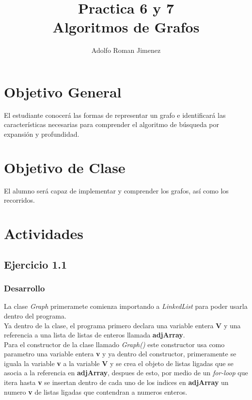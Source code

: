 \documentclass{article}
\title
{
	Practica 6 y 7\\
	Algoritmos de Grafos
}
\author
{
	Adolfo Roman Jimenez
}
\begin{document}
	
	
	
	\maketitle
	
	\section{Objetivo General}
	
	El estudiante conocerá las formas de representar un grafo e identificará las
	características necesarias para comprender el algoritmo de búsqueda por expansión y	profundidad.
	
	\section{Objetivo de Clase}
	
	El alumno será capaz de implementar y comprender los grafos, así como los
	recorridos. 
	
	\newpage
	
	\section{Actividades}
	
		\subsection{Ejercicio 1.1}
		
			\subsubsection{Desarrollo}
			
			
				La clase \emph{Graph} primeramete comienza importando a \emph{LinkedList} para poder usarla dentro del programa.\\
				
				Ya dentro de la clase, el programa primero declara una variable entera \textbf{V} y una referencia a una lista de listas de enteros llamada \textbf{adjArray}.\\
				
				Para el constructor de la clase llamado \emph{Graph()} este constructor usa como parametro una variable entera \textbf{v} y ya dentro del constructor, primeramente se iguala la variable \textbf{v} a la variable \textbf{V} y se crea el objeto de listas ligadas que se asocia a la referencia en \textbf{adjArray}, despues de esto, por medio de un \textit{for-loop} que itera hasta \textbf{v} se insertan dentro de cada uno de los indices en \textbf{adjArray} un numero \textbf{v} de listas ligadas que contendran a numeros enteros.\\
				
\end{document}
